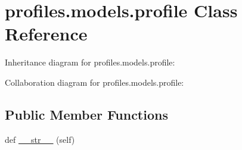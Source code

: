 \hypertarget{classprofiles_1_1models_1_1profile}{}\section{profiles.\+models.\+profile Class Reference}
\label{classprofiles_1_1models_1_1profile}


Inheritance diagram for profiles.\+models.\+profile\+:


Collaboration diagram for profiles.\+models.\+profile\+:
\subsection*{Public Member Functions}
\begin{DoxyCompactItemize}
\item 
def \hyperlink{classprofiles_1_1models_1_1profile_aa53e2547357713bbf6c4f7c0d04406f6}{\+\_\+\+\_\+str\+\_\+\+\_\+} (self)
\end{DoxyCompactItemize}
